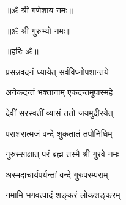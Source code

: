 
\centerline{॥ॐ श्री गणेशाय नमः॥}
\centerline{॥ॐ श्री गुरुभ्यो नमः॥}
\centerline{॥हरिः ॐ॥}
{प्रसन्नवदनं ध्यायेत् सर्वविघ्नोपशान्तये}

{अनेकदन्तं भक्तानाम् एकदन्तमुपास्महे}

{देवीं सरस्वतीं व्यासं ततो जयमुदीरयेत्}

{पराशरात्मजं वन्दे शुकतातं तपोनिधिम्}

{गुरुस्साक्षात् परं ब्रह्म तस्मै श्री गुरवे नमः}

{अस्मदाचार्यपर्यन्तां वन्दे गुरुपरम्पराम्}

{नमामि भगवत्पादं शङ्करं लोकशङ्करम्}
\closesection